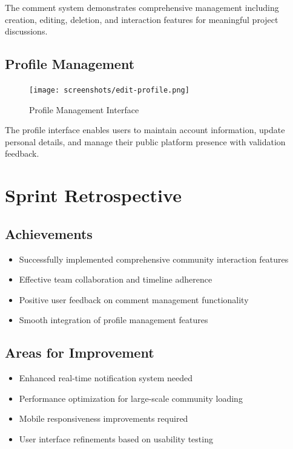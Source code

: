 The comment system demonstrates comprehensive management including creation, editing, deletion, and interaction features for meaningful project discussions.

\subsection{Profile Management}

\begin{figure}[H]
\centering
\texttt{[image: screenshots/edit-profile.png]}
\caption{Profile Management Interface}
\label{fig:edit_profile}
\end{figure}

The profile interface enables users to maintain account information, update personal details, and manage their public platform presence with validation feedback.

\section{Sprint Retrospective}

\subsection{Achievements}
\begin{itemize}
\item Successfully implemented comprehensive community interaction features
\item Effective team collaboration and timeline adherence
\item Positive user feedback on comment management functionality
\item Smooth integration of profile management features
\end{itemize}

\subsection{Areas for Improvement}
\begin{itemize}
\item Enhanced real-time notification system needed
\item Performance optimization for large-scale community loading
\item Mobile responsiveness improvements required
\item User interface refinements based on usability testing
\end{itemize}


